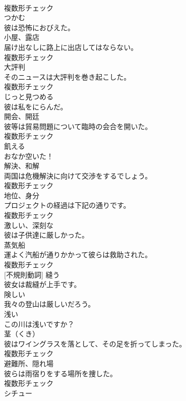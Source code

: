\documentclass[8pt]{extreport}
\begin{document}
\begin{CJK}{UTF8}{min}
\\	複数形チェック
\\	[動詞]	つかむ	
\\	彼は恐怖におびえた。	
\\	[名詞]	小屋、露店	
\\	届け出なしに路上に出店してはならない。	
\\	複数形チェック
\\	[名詞]	大評判	
\\	そのニュースは大評判を巻き起こした。	
\\	複数形チェック
\\	[動詞]	じっと見つめる	
\\	彼は私をにらんだ。	
\\	[名詞]	開会、開廷	
\\	彼等は貿易問題について臨時の会合を開いた。	
\\	複数形チェック
\\	[動詞]	飢える	
\\	おなか空いた！	
\\	[名詞]	解決、和解	
\\	両国は危機解決に向けて交渉をするでしょう。	
\\	複数形チェック
\\	[名詞]	地位、身分	
\\	プロジェクトの経過は下記の通りです。	
\\	複数形チェック
\\	[形容詞]	激しい、深刻な	
\\	彼は子供達に厳しかった。	
\\	[名詞]	蒸気船	
\\	運よく汽船が通りかかって彼らは救助された。	
\\	複数形チェック
\\	[動詞] [不規則動詞]	縫う	
\\	彼女は裁縫が上手です。	
\\	[形容詞]	険しい	
\\	我々の登山は厳しいだろう。	
\\	[形容詞]	浅い	
\\	この川は浅いですか？	
\\	[名詞]	茎（くき）	
\\	彼はワイングラスを落として、その足を折ってしまった。	
\\	複数形チェック
\\	[名詞]	避難所、隠れ場	
\\	彼らは雨宿りをする場所を捜した。	
\\	複数形チェック
\\	[名詞]	シチュー	

\end{CJK}
\end{document}
